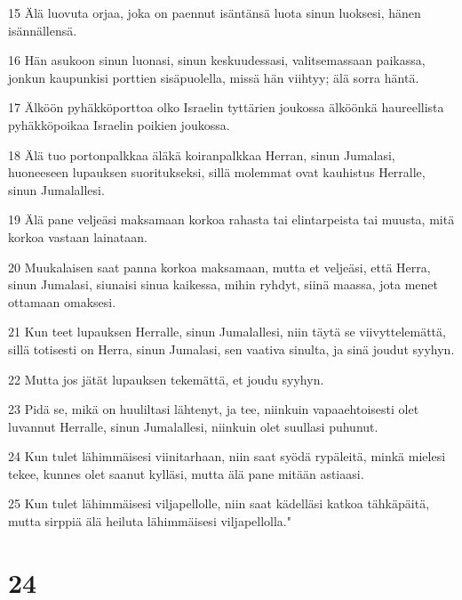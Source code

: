 \par 15 Älä luovuta orjaa, joka on paennut isäntänsä luota sinun luoksesi, hänen isännällensä.
\par 16 Hän asukoon sinun luonasi, sinun keskuudessasi, valitsemassaan paikassa, jonkun kaupunkisi porttien sisäpuolella, missä hän viihtyy; älä sorra häntä.
\par 17 Älköön pyhäkköporttoa olko Israelin tyttärien joukossa älköönkä haureellista pyhäkköpoikaa Israelin poikien joukossa.
\par 18 Älä tuo portonpalkkaa äläkä koiranpalkkaa Herran, sinun Jumalasi, huoneeseen lupauksen suoritukseksi, sillä molemmat ovat kauhistus Herralle, sinun Jumalallesi.
\par 19 Älä pane veljeäsi maksamaan korkoa rahasta tai elintarpeista tai muusta, mitä korkoa vastaan lainataan.
\par 20 Muukalaisen saat panna korkoa maksamaan, mutta et veljeäsi, että Herra, sinun Jumalasi, siunaisi sinua kaikessa, mihin ryhdyt, siinä maassa, jota menet ottamaan omaksesi.
\par 21 Kun teet lupauksen Herralle, sinun Jumalallesi, niin täytä se viivyttelemättä, sillä totisesti on Herra, sinun Jumalasi, sen vaativa sinulta, ja sinä joudut syyhyn.
\par 22 Mutta jos jätät lupauksen tekemättä, et joudu syyhyn.
\par 23 Pidä se, mikä on huuliltasi lähtenyt, ja tee, niinkuin vapaaehtoisesti olet luvannut Herralle, sinun Jumalallesi, niinkuin olet suullasi puhunut.
\par 24 Kun tulet lähimmäisesi viinitarhaan, niin saat syödä rypäleitä, minkä mielesi tekee, kunnes olet saanut kylläsi, mutta älä pane mitään astiaasi.
\par 25 Kun tulet lähimmäisesi viljapellolle, niin saat kädelläsi katkoa tähkäpäitä, mutta sirppiä älä heiluta lähimmäisesi viljapellolla."

\chapter{24}

